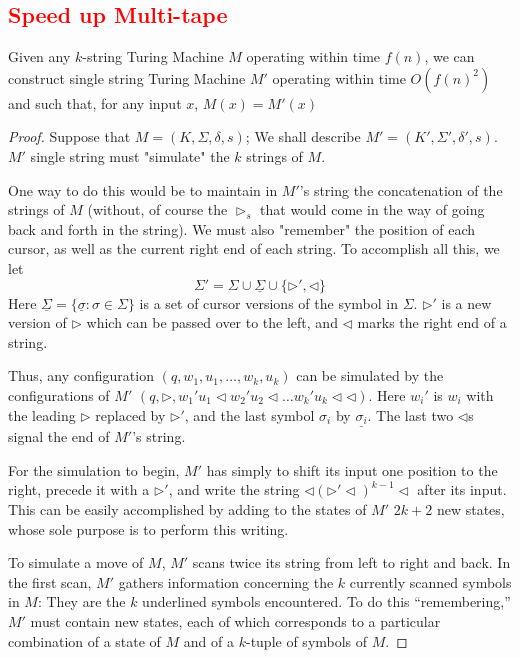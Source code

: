 \documentclass[12pt]{article}
\newcommand{\uSigma}{\underline\Sigma}
\newcommand{\usigma}{\underline\sigma}
\newcommand{\tr}{\triangleright}
\newcommand{\tl}{\triangleleft}
\begin{document}
\subsection{\textcolor{red}{Speed up Multi-tape}}

\begin{defbox}[\textcolor{red}{Theorem (Speed up Multi-tape)}]
  Given any $k$-string Turing Machine $M$ operating within time $f(n)$, we can construct single string Turing Machine $M'$ operating within time $O(f(n)^2)$ and such that, for any input $x$, $M(x)=M'(x)$
\end{defbox}
\begin{proof}
Suppose that $M=(K,\Sigma,\delta,s)$; We shall describe $M'=(K',\Sigma',\delta',s)$. 
  $M'$ single string must "simulate" the $k$ strings of $M$. 
  
  One way to do this would be to maintain in $M'$'s string the concatenation of the strings of $M$ (without, of course the $\tr_s$ that would come in the way of going back and forth in the string). We must also "remember" the position of each cursor, as well as the current right end of each string.
  To accomplish all this, we let $$\Sigma'=\Sigma\cup\uSigma\cup\{\tr',\tl\}$$ Here $\uSigma=\{\usigma:\sigma\in\Sigma\}$ is a set of cursor versions of the symbol in $\Sigma$.
  $\tr'$ is a new version of $\tr$ which can be passed over to the left, and $\tl$ marks the right end of a string.
  
  Thus, any configuration $(q,w_1,u_1,\dots,w_k,u_k)$ can be simulated by the configurations of $M'$ $(q,\tr,w_1'u_1\tl w_2'u_2\tl\dots w_k'u_k\tl\tl)$. Here $w_i'$ is $w_i$ with the leading $\triangleright$ replaced by $\triangleright'$, and the last symbol $\sigma_i$ by $\underline{\sigma_i}$. The last two $\triangleleft$s signal the end of $M'$'s string.

  For the simulation to begin, $M'$ has simply to shift its input one position to the right, precede it with a $\triangleright'$, and write the string 
  $ \triangleleft (\triangleright' \triangleleft)^{k-1} \triangleleft$
  after its input. This can be easily accomplished by adding to the states of $M'$ $2k + 2$ new states, whose sole purpose is to perform this writing.
  
  To simulate a move of $M$, $M'$ scans twice its string from left to right and back. In the first scan, $M'$ gathers information concerning the $k$ currently scanned symbols in $M$: They are the $k$ underlined symbols encountered. To do this ``remembering,'' $M'$ must contain new states, each of which corresponds to a particular combination of a state of $M$ and of a $k$-tuple of symbols of $M$.
  

\end{proof}
\end{document}
